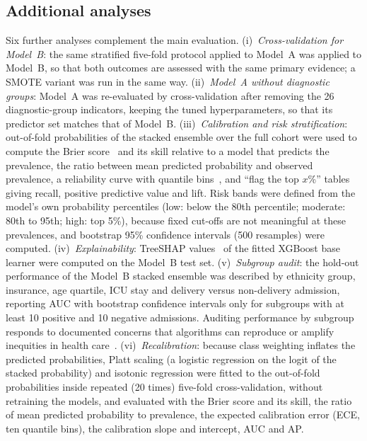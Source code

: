 \documentclass[healthcare,article,submit,pdftex,moreauthors]{Definitions/mdpi}
\begin{document}
\subsection{Additional analyses}\label{sec:additional}
Six further analyses complement the main evaluation.
(i)~\emph{Cross-validation for Model~B}: the same stratified five-fold protocol applied to
Model~A was applied to Model~B, so that both outcomes are assessed with the same primary
evidence; a SMOTE variant was run in the same way.
(ii)~\emph{Model~A without diagnostic groups}: Model~A was re-evaluated by cross-validation
after removing the 26 diagnostic-group indicators, keeping the tuned hyperparameters, so
that its predictor set matches that of Model~B.
(iii)~\emph{Calibration and risk stratification}: out-of-fold probabilities of the stacked
ensemble over the full cohort were used to compute the Brier score~\cite{Brier1950} and its skill relative to
a model that predicts the prevalence, the ratio between mean predicted probability and
observed prevalence, a reliability curve with quantile bins~\cite{VanCalster2019Calibration,Guo2017Calibration}, and ``flag the top $x$\%''
tables giving recall, positive predictive value and lift. Risk bands were defined from the
model's own probability percentiles (low: below the 80th percentile; moderate: 80th to 95th;
high: top 5\%), because fixed cut-offs are not meaningful at these prevalences, and
bootstrap 95\% confidence intervals (500 resamples) were computed.
(iv)~\emph{Explainability}: TreeSHAP values~\cite{Lundberg2017SHAP,Lundberg2020TreeSHAP} of the fitted XGBoost base learner were computed on
the Model~B test set.
(v)~\emph{Subgroup audit}: the hold-out performance of the Model~B stacked ensemble was
described by ethnicity group, insurance, age quartile, ICU stay and delivery versus
non-delivery admission, reporting AUC with bootstrap confidence intervals only for
subgroups with at least 10 positive and 10 negative admissions. Auditing performance by subgroup responds to documented concerns that algorithms can reproduce or amplify inequities in health care~\cite{Obermeyer2019Bias,Rajkomar2018Fairness}.
(vi)~\emph{Recalibration}: because class weighting inflates the predicted probabilities, Platt scaling (a logistic regression on the logit of the stacked probability) and isotonic regression were fitted to the out-of-fold probabilities inside repeated (20 times) five-fold cross-validation, without retraining the models, and evaluated with the Brier score and its skill, the ratio of mean predicted probability to prevalence, the expected calibration error (ECE, ten quantile bins), the calibration slope and intercept, AUC and AP.
\end{document}
